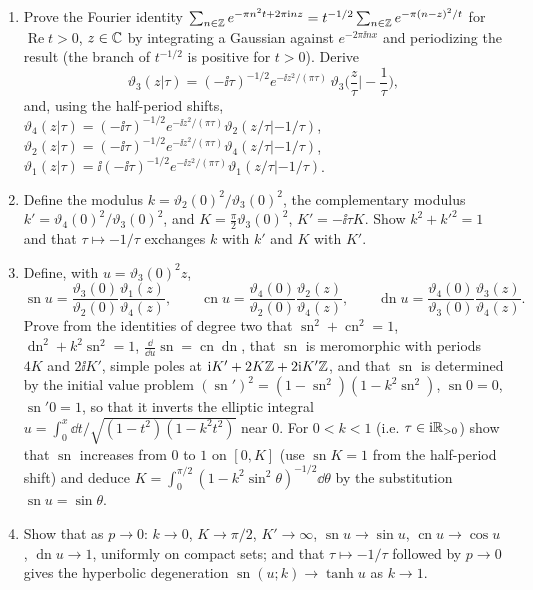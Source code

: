 \begin{exercise}
\leavevmode\par
\begin{enumerate}[label=(\alph*)]
\item Prove the Fourier identity
$\sum_{n\in\mathbb Z}e^{-\pi n^2t+2\pi\mathrm i nz}=t^{-1/2}\sum_{n\in\mathbb Z}e^{-\pi(n-z)^2/t}$
for $\operatorname{Re}t>0$, $z\in\mathbb C$ by integrating a Gaussian against $e^{-2\pi\ii nx}$ and
periodizing the result (the branch of $t^{-1/2}$ is positive
for $t>0$). Derive
\[
 \vartheta_3(z|\tau)=(-\ii\tau)^{-1/2}e^{-\ii z^2/(\pi\tau)}\,\vartheta_3\!\Big(\frac z\tau\Big|-\frac1\tau\Big),
\]
and, using the half-period shifts,
$\vartheta_4(z|\tau)=(-\ii\tau)^{-1/2}e^{-\ii z^2/(\pi\tau)}\vartheta_2(z/\tau|-1/\tau)$,
$\vartheta_2(z|\tau)=(-\ii\tau)^{-1/2}e^{-\ii z^2/(\pi\tau)}\vartheta_4(z/\tau|-1/\tau)$,
$\vartheta_1(z|\tau)=\ii(-\ii\tau)^{-1/2}e^{-\ii z^2/(\pi\tau)}\vartheta_1(z/\tau|-1/\tau)$.
\item Define the modulus $k=\vartheta_2(0)^2/\vartheta_3(0)^2$, the
complementary modulus $k'=\vartheta_4(0)^2/\vartheta_3(0)^2$, and
$K=\frac\pi2\vartheta_3(0)^2$, $K'=-\ii\tau K$.  Show $k^2+k'^2=1$ and that
$\tau\mapsto-1/\tau$ exchanges $k$ with $k'$ and $K$ with $K'$.
\item Define, with $u=\vartheta_3(0)^2z$,
\[
 \operatorname{sn}u=\frac{\vartheta_3(0)}{\vartheta_2(0)}\frac{\vartheta_1(z)}{\vartheta_4(z)},\qquad
 \operatorname{cn}u=\frac{\vartheta_4(0)}{\vartheta_2(0)}\frac{\vartheta_2(z)}{\vartheta_4(z)},\qquad
 \operatorname{dn}u=\frac{\vartheta_4(0)}{\vartheta_3(0)}\frac{\vartheta_3(z)}{\vartheta_4(z)}.
\]
Prove from the identities of degree two that
$\operatorname{sn}^2+\operatorname{cn}^2=1$, $\operatorname{dn}^2+k^2\operatorname{sn}^2=1$,
$\frac{\dd}{\dd u}\operatorname{sn}=\operatorname{cn}\operatorname{dn}$, that
$\operatorname{sn}$ is meromorphic with periods $4K$ and $2\ii K'$, simple
poles at $\mathrm i K'+2K\mathbb Z+2\mathrm i K'\mathbb Z$, and that $\operatorname{sn}$ is
determined by the initial value problem
$(\operatorname{sn}')^2=(1-\operatorname{sn}^2)(1-k^2\operatorname{sn}^2)$, $\operatorname{sn}0=0$, $\operatorname{sn}'0=1$,
so that it inverts the elliptic integral
$u=\int_0^{x}\dd t/\sqrt{(1-t^2)(1-k^2t^2)}$ near $0$.  For $0<k<1$
(i.e. $\tau\in\mathrm i\mathbb R_{>0}$) show that $\operatorname{sn}$ increases from
$0$ to $1$ on $[0,K]$ (use $\operatorname{sn}K=1$ from the half-period
shift) and deduce $K=\int_0^{\pi/2}(1-k^2\sin^2\theta)^{-1/2}\dd\theta$
by the substitution $\operatorname{sn}u=\sin\theta$.
\item Show that as $p\to0$: $k\to0$, $K\to\pi/2$, $K'\to\infty$,
$\operatorname{sn}u\to\sin u$, $\operatorname{cn}u\to\cos u$, $\operatorname{dn}u\to1$,
uniformly on compact sets; and that $\tau\mapsto-1/\tau$ followed by
$p\to0$ gives the hyperbolic degeneration $\operatorname{sn}(u;k)\to\tanh u$ as $k\to1$.
\end{enumerate}
\end{exercise}

